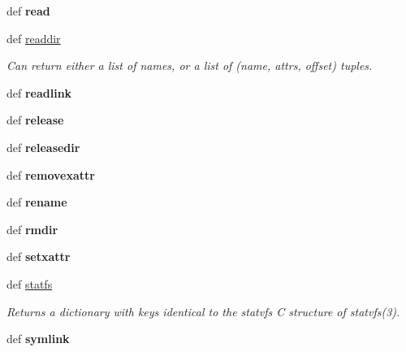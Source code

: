 \begin{DoxyCompactItemize}
\item 
\hypertarget{classfuse_1_1Operations_a15aa5b6291d1892e288c0dc7760b5396}{def {\bfseries read}}\label{classfuse_1_1Operations_a15aa5b6291d1892e288c0dc7760b5396}

\item 
def \hyperlink{classfuse_1_1Operations_ad88fad4a9a1f81c483dce93cc9924e20}{readdir}
\begin{DoxyCompactList}\small\item\em Can return either a list of names, or a list of (name, attrs, offset) tuples. \end{DoxyCompactList}\item 
\hypertarget{classfuse_1_1Operations_a9ea6a7f9d55481cbc7d0866e8911fa45}{def {\bfseries readlink}}\label{classfuse_1_1Operations_a9ea6a7f9d55481cbc7d0866e8911fa45}

\item 
\hypertarget{classfuse_1_1Operations_a44d7d97f3a549e56b107b47d0833a96a}{def {\bfseries release}}\label{classfuse_1_1Operations_a44d7d97f3a549e56b107b47d0833a96a}

\item 
\hypertarget{classfuse_1_1Operations_a36891761f9ef8942c72d1e7bec2e678d}{def {\bfseries releasedir}}\label{classfuse_1_1Operations_a36891761f9ef8942c72d1e7bec2e678d}

\item 
\hypertarget{classfuse_1_1Operations_ad1d3efbbb3e100b08893e3ec04c20730}{def {\bfseries removexattr}}\label{classfuse_1_1Operations_ad1d3efbbb3e100b08893e3ec04c20730}

\item 
\hypertarget{classfuse_1_1Operations_a0dbeced6cf9f9c9c43853b75abb04a75}{def {\bfseries rename}}\label{classfuse_1_1Operations_a0dbeced6cf9f9c9c43853b75abb04a75}

\item 
\hypertarget{classfuse_1_1Operations_aee30625a18d61f6ea862250a711e2b77}{def {\bfseries rmdir}}\label{classfuse_1_1Operations_aee30625a18d61f6ea862250a711e2b77}

\item 
\hypertarget{classfuse_1_1Operations_a649711b4f7e579f792a044d5ecf55284}{def {\bfseries setxattr}}\label{classfuse_1_1Operations_a649711b4f7e579f792a044d5ecf55284}

\item 
def \hyperlink{classfuse_1_1Operations_a078245db67fbd0b7ff6073db68e8e215}{statfs}
\begin{DoxyCompactList}\small\item\em Returns a dictionary with keys identical to the statvfs C structure of statvfs(3). \end{DoxyCompactList}\item 
\hypertarget{classfuse_1_1Operations_a41af9d6668eaf2677bba960a22db3e8e}{def {\bfseries symlink}}\label{classfuse_1_1Operations_a41af9d6668eaf2677bba960a22db3e8e}


\end{DoxyCompactItemize}
